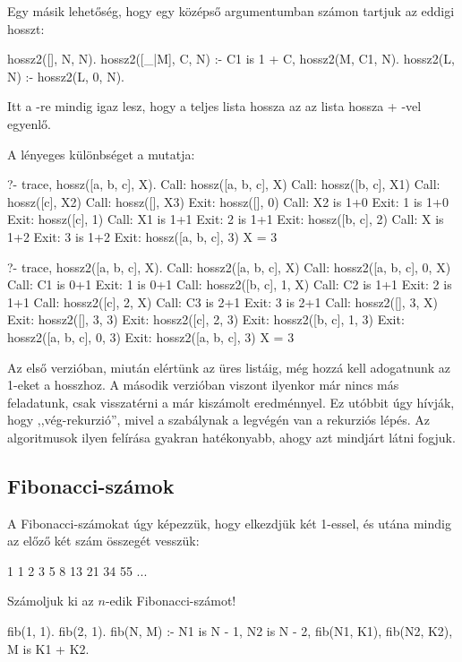 Egy másik lehetőség, hogy egy középső argumentumban
számon tartjuk az eddigi hosszt:
\begin{program}
hossz2([], N, N).
hossz2([_|M], C, N) :- C1 is 1 + C, hossz2(M, C1, N).
hossz2(L, N) :- hossz2(L, 0, N).
\end{program}
Itt a -re mindig igaz lesz,
hogy a teljes lista hossza az az  lista
hossza + -vel egyenlő.

A lényeges különbséget a  mutatja:
\begin{query}
?- trace, hossz([a, b, c], X).
Call: hossz([a, b, c], X)
  Call: hossz([b, c], X1)
    Call: hossz([c], X2)
      Call: hossz([], X3)
      Exit: hossz([], 0)
      Call: X2 is 1+0
      Exit: 1 is 1+0
    Exit: hossz([c], 1)
    Call: X1 is 1+1
    Exit: 2 is 1+1
  Exit: hossz([b, c], 2)
  Call: X is 1+2
  Exit: 3 is 1+2
Exit: hossz([a, b, c], 3)
X = 3

?- trace, hossz2([a, b, c], X).
Call: hossz2([a, b, c], X)
  Call: hossz2([a, b, c], 0, X)
    Call: C1 is 0+1
    Exit: 1 is 0+1
    Call: hossz2([b, c], 1, X)
      Call: C2 is 1+1
      Exit: 2 is 1+1
      Call: hossz2([c], 2, X)
        Call: C3 is 2+1
        Exit: 3 is 2+1
        Call: hossz2([], 3, X)
        Exit: hossz2([], 3, 3)
      Exit: hossz2([c], 2, 3)
    Exit: hossz2([b, c], 1, 3)
  Exit: hossz2([a, b, c], 0, 3)
Exit: hossz2([a, b, c], 3)
X = 3
\end{query}
Az első verzióban, miután elértünk az üres listáig,
még hozzá kell adogatnunk az 1-eket a hosszhoz. A
második verzióban viszont ilyenkor már nincs más
feladatunk, csak visszatérni a már kiszámolt
eredménnyel. Ez utóbbit úgy hívják, hogy
,,vég-rekurzió'', mivel a szabálynak a legvégén van
a rekurziós lépés. Az algoritmusok ilyen felírása
gyakran hatékonyabb, ahogy azt mindjárt látni
fogjuk.

\subsection*{Fibonacci-számok}
A Fibonacci-számokat úgy képezzük, hogy elkezdjük
két 1-essel, és utána mindig az előző két szám
összegét vesszük:
\begin{query}
1 1 2 3 5 8 13 21 34 55 ...
\end{query}
Számoljuk ki az $n$-edik Fibonacci-számot!
\begin{program}
fib(1, 1).
fib(2, 1).
fib(N, M) :-
    N1 is N - 1, N2 is N - 2,
    fib(N1, K1), fib(N2, K2),
    M is K1 + K2.
\end{program}

